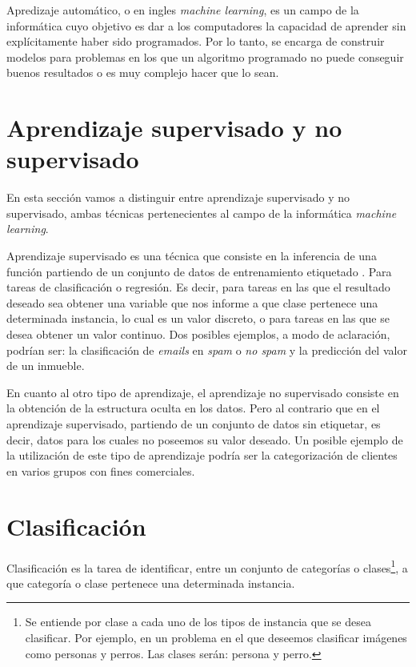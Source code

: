 Apredizaje automático, o en ingles \textit{machine learning}, es un campo de la informática cuyo objetivo es dar a los computadores la capacidad de aprender sin explícitamente haber sido programados\cite{wiki:machinelearning}. Por lo tanto, se encarga de construir modelos para problemas en los que un algoritmo programado no puede conseguir buenos resultados o es muy complejo hacer que lo sean.



\section{Aprendizaje supervisado y no supervisado}

En esta sección vamos a distinguir entre aprendizaje supervisado y no supervisado, ambas técnicas pertenecientes al campo de la informática \textit{machine learning}.

Aprendizaje supervisado es una técnica que consiste en la inferencia de una función partiendo de un conjunto de datos de entrenamiento etiquetado \cite{wiki:supervisedLearning}. Para tareas de clasificación o regresión. Es decir, para tareas en las que el resultado deseado sea obtener una variable que nos informe a que clase pertenece una determinada instancia, lo cual es un valor discreto, o para tareas en las que se desea obtener un valor continuo. Dos posibles ejemplos, a modo de aclaración,  podrían ser: la clasificación de \textit{emails} en \textit{spam} o \textit{no spam} y la predicción del valor de un inmueble.

En cuanto al otro tipo de aprendizaje, el aprendizaje no supervisado consiste en la obtención de la estructura oculta en los datos. Pero al contrario que en el aprendizaje supervisado, partiendo de un conjunto de datos sin etiquetar, es decir, datos para los cuales no poseemos su valor deseado\cite{wiki:unsupervisedLearning}. Un posible ejemplo  de la utilización de este tipo de aprendizaje podría ser la categorización de clientes en varios grupos con fines comerciales.

\section{Clasificación}

Clasificación es la tarea de identificar, entre un conjunto de  categorías o clases\footnote{Se entiende por clase a cada uno de los tipos de instancia que se desea clasificar. Por ejemplo, en un problema en el que deseemos clasificar imágenes como personas y perros. Las clases serán: persona y perro.}, a que categoría o clase pertenece una determinada instancia.

